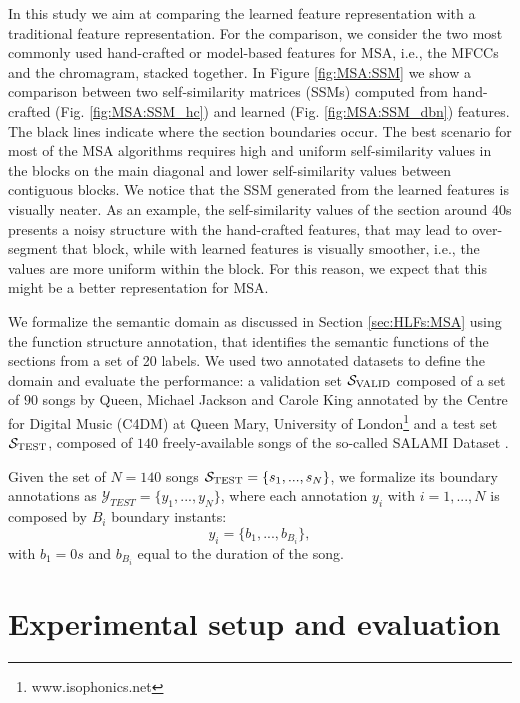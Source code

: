  
In this study we aim at comparing the learned feature representation with a traditional feature representation. For the comparison, we consider the two most commonly used hand-crafted or model-based features for MSA, i.e., the MFCCs and the chromagram, stacked together. In Figure \ref{fig:MSA:SSM} we show a comparison between two self-similarity matrices (SSMs) computed from hand-crafted (Fig. \ref{fig:MSA:SSM_hc}) and learned (Fig. \ref{fig:MSA:SSM_dbn}) features. The black lines indicate where the section boundaries occur. The best scenario for most of the MSA algorithms requires high and uniform self-similarity values in the blocks on the main diagonal and lower self-similarity values between contiguous blocks. We notice that the SSM generated from the learned features is visually neater. As an example, the self-similarity values of the section around 40s presents a noisy structure with the hand-crafted features, that may lead to over-segment that block, while with learned features is visually smoother, i.e., the values are more uniform within the block. For this reason, we expect that this might be a better representation for MSA.  

We formalize the semantic domain as discussed in Section \ref{sec:HLFs:MSA} using the function structure annotation, that identifies the semantic functions of the sections from a set of 20 labels. We used two annotated datasets to define the domain and evaluate the performance: a validation set $\mathcal{S}_\text{VALID}$ composed of a set of $90$ songs by Queen, Michael Jackson and Carole King annotated by the Centre for Digital Music (C4DM) at Queen Mary, University of London\footnote{www.isophonics.net} and a test set $\mathcal{S}_\text{TEST}$, composed of $140$ freely-available songs of the so-called SALAMI Dataset \cite{Smith2011}. 

Given the set of $N=140$ songs $\mathcal{S}_\text{TEST}=\{s_1,...,s_N\}$, we formalize its boundary annotations as $\mathcal{Y}_{TEST}=\{y_1,...,y_N\}$, where each annotation $y_i$ with $i=1,...,N$ is composed by $B_i$ boundary instants:
\begin{equation}
y_i=\{b_1,...,b_{B_i}\}, 
\end{equation}
with $b_1=0s$ and $b_{B_i}$ equal to the duration of the song. 

\section{Experimental setup and evaluation}
